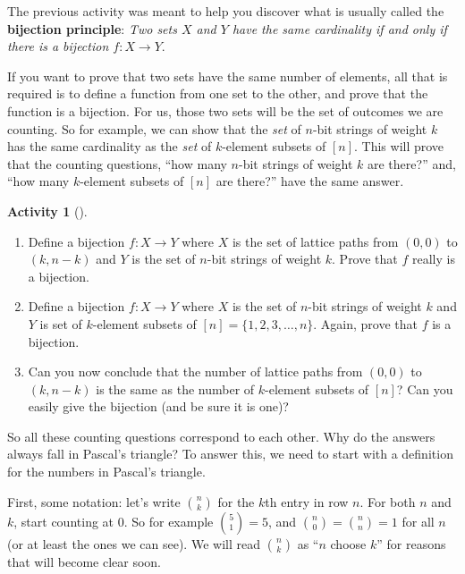 \documentclass[10pt,]{book}
\newcommand{\terminology}[1]{\textbf{#1}}
\theoremstyle{plain}
\theoremstyle{definition}
\theoremstyle{definition}
\theoremstyle{definition}
\newtheorem{activity}[project]{Activity}
\numberwithin{equation}{chapter}
\begin{document}
\hypertarget{p-62}{}%
The previous activity was meant to help you discover what is usually called the \terminology{bijection principle}: \emph{Two sets \(X\) and \(Y\) have the same cardinality if and only if there is a bijection \(f:X \to Y\)}.%
\par
\hypertarget{p-63}{}%
If you want to prove that two sets have the same number of elements, all that is required is to define a function from one set to the other, and prove that the function is a bijection.  For us, those two sets will be the set of outcomes we are counting.  So for example, we can show that the \emph{set} of \(n\)-bit strings of weight \(k\) has the same cardinality as the \emph{set} of \(k\)-element subsets of \([n]\).  This will prove that the counting questions, ``how many \(n\)-bit strings of weight \(k\) are there?'' and, ``how many \(k\)-element subsets of \([n]\) are there?'' have the same answer.%
\par
\hypertarget{p-64}{}%
%
\begin{activity}[]\label{activity-8}
\leavevmode%
\begin{enumerate}[font=\bfseries,label=(\alph*),ref=\alph*]
\item\label{task-26} \hypertarget{p-65}{}%
Define a bijection \(f:X \to Y\) where \(X\) is the set of lattice paths from \((0,0)\) to \((k,n-k)\) and \(Y\) is the set of \(n\)-bit strings of weight \(k\). Prove that \(f\) really is a bijection.%
\item\label{task-27} \hypertarget{p-66}{}%
Define a bijection \(f:X \to Y\) where \(X\) is the set of \(n\)-bit strings of weight \(k\) and \(Y\) is set of \(k\)-element subsets of \([n] = \{1,2,3,\ldots, n\}\).  Again, prove that \(f\) is a bijection.%
\item\label{task-28} \hypertarget{p-67}{}%
Can you now conclude that the number of lattice paths from \((0,0)\) to \((k,n-k)\) is the same as the number of \(k\)-element subsets of \([n]\)?  Can you easily give the bijection (and be sure it is one)?%
\end{enumerate}
\end{activity}
\hypertarget{p-68}{}%
So all these counting questions correspond to each other.  Why do the answers always fall in Pascal's triangle?  To answer this, we need to start with a definition for the numbers in Pascal's triangle.%
\par
\hypertarget{p-69}{}%
First, some notation: let's write \(\binom{n}{k}\) for the \(k\)th entry in row \(n\).  For both \(n\) and \(k\), start counting at 0.  So for example \(\binom{5}{1} = 5\), and \(\binom{n}{0} = \binom{n}{n} = 1\) for all \(n\) (or at least the ones we can see).  We will read \(\binom{n}{k}\) as ``\(n\) choose \(k\)'' for reasons that will become clear soon.%
\end{document}
